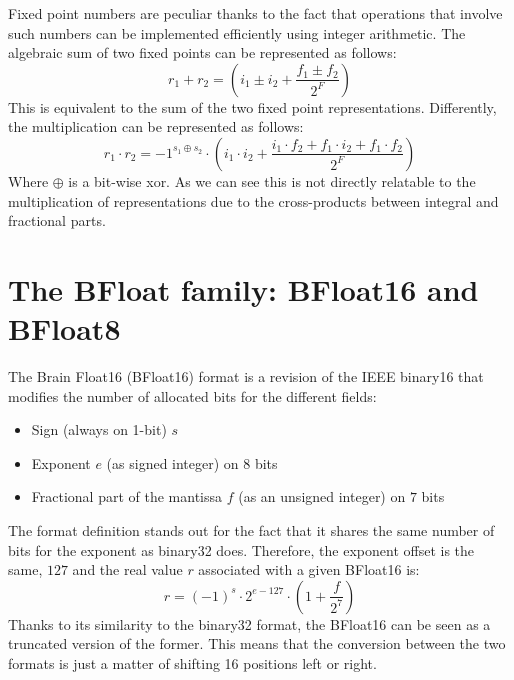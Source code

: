 Fixed point numbers are peculiar thanks to the fact that operations that involve such numbers can be implemented efficiently using integer arithmetic.
The algebraic sum of two fixed points can be represented as follows:
\begin{equation}\label{eqn:fixedSum}
    r_1 + r_2 = \left(i_1 \pm i_2 + \frac{f_1 \pm f_2}{2^{F}}\right)
\end{equation}
This is equivalent to the sum of the two fixed point representations.
Differently, the multiplication can be represented as follows:
\begin{equation}\label{eqn:fixedMul}
    r_1 \cdot r_2 = -1^{s_1 \oplus s_2}\cdot \left(i_1 \cdot i_2 + \frac{i_1 \cdot f_2 + f_1\cdot i_2 + f_1 \cdot f_2}{2^F}\right) 
\end{equation}
Where $\oplus$ is a bit-wise xor.
As we can see this is not directly relatable to the multiplication of representations due to the cross-products between integral and fractional parts.

\section{The BFloat family: BFloat16 and BFloat8}

The Brain Float16 (BFloat16) format \cite{burgess2019bfloat} is a revision of the IEEE binary16 that modifies the number of allocated bits for the different fields:
\begin{itemize}
    \item Sign (always on 1-bit) $s$
    \item Exponent $e$ (as signed integer) on $8$ bits
    \item Fractional part of the mantissa $f$ (as an unsigned integer) on $7$ bits
\end{itemize}
The format definition stands out for the fact that it shares the same number of bits for the exponent as binary32 does. Therefore, the exponent offset is the same, $127$ and the real value $r$ associated with a given BFloat16 is:
\begin{equation}\label{eqn:bfloat162real}
    r = (-1)^s \cdot 2^{e-127} \cdot \left(1 + \frac{f}{2^7} \right)
\end{equation}
Thanks to its similarity to the binary32 format, the BFloat16 can be seen as a truncated version of the former. This means that the conversion between the two formats is just a matter of shifting 16 positions left or right.

